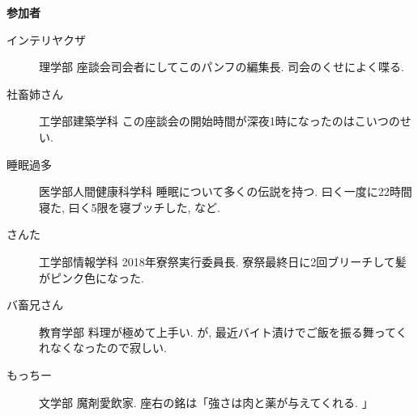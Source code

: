 \documentclass[10pt,b5jsbook,dvips,dvipdfmx,openany]{jsbook}
\theoremstyle{definition}
\begin{document}
		\begin{itembox}[l]{\bf 参加者}
		\begin{description}
		\item[インテリヤクザ] 理学部 座談会司会者にしてこのパンフの編集長. 司会のくせによく喋る.
		\item[社畜姉さん]工学部建築学科 この座談会の開始時間が深夜1時になったのはこいつのせい.
		\item[睡眠過多] 医学部人間健康科学科 睡眠について多くの伝説を持つ. 曰く一度に22時間寝た, 曰く5限を寝ブッチした, など.
		\item[さんた] 工学部情報学科 2018年寮祭実行委員長. 寮祭最終日に2回ブリーチして髪がピンク色になった.
		\item[バ畜兄さん] 教育学部 料理が極めて上手い. が, 最近バイト漬けでご飯を振る舞ってくれなくなったので寂しい.
		\item[もっちー] 文学部 魔剤愛飲家. 座右の銘は「強さは肉と薬が与えてくれる. 」
		\end{description}
		\end{itembox}
\small
\end{document}
